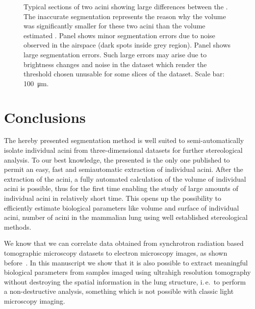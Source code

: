 \documentclass[final,paper=a4,DIV=calc,abstract,english]{scrartcl}
\newcommand{\ie}{i.\,e.\ }
\begin{document}
\begin{figure}[htb]
{		\label{subfig:60e_acinus38}%
	}%
	\hfill%
	\caption{Typical sections of two acini showing large differences between the .
		The inaccurate segmentation represents the reason why the  volume was significantly smaller for these two acini than the volume estimated .
		Panel \protect{} shows minor segmentation errors due to noise observed in the airspace (dark spots inside grey region).
		Panel \protect{} shows large segmentation errors.
		Such large errors may arise due to brightness changes and noise in the dataset which render the threshold chosen unusable for some slices of the dataset.
		Scale bar: \SI{100}{\micro\meter}.}
	\label{fig:MeVisSegmentation}
\end{figure}

\section{Conclusions}
The hereby presented segmentation method is well suited to semi-automatically isolate individual acini from three-dimensional datasets for further stereological analysis.
To our best knowledge, the presented  is the only one published to permit an easy, fast and semiautomatic extraction of individual acini.
After the extraction of the acini, a fully automated calculation of the volume of individual acini is possible, thus for the first time enabling the study of large amounts of individual acini in relatively short time.
This opens up the possibility to efficiently estimate biological parameters like volume and surface of individual acini, number of acini in the mammalian lung using well established stereological methods.

We know that we can correlate data obtained from synchrotron radiation based tomographic microscopy datasets to electron microscopy images, as shown before~\citep{Haberthuer2009}.
In this manuscript we show that it is also possible to extract meaningful biological parameters from samples imaged using ultrahigh resolution tomography without destroying the spatial information in the lung structure, \ie to perform a non-destructive analysis, something which is not possible with classic light microscopy imaging.
\end{document}
